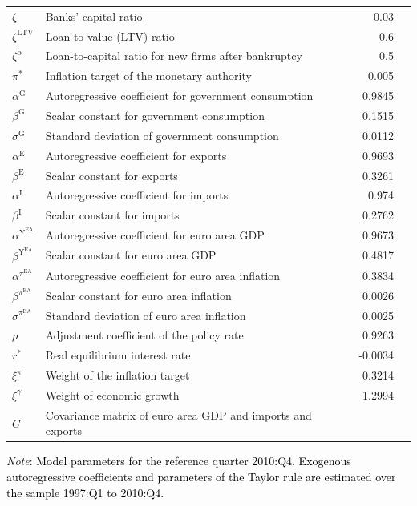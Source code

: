 \begin{table}[!htbp]
{\begin{tabular}{llrl}
			$\zeta$ & Banks' capital ratio & 0.03 & \\ 
			$\zeta^{\mathrm{LTV}}$ & Loan-to-value (LTV) ratio & 0.6 & \\ 
			$\zeta^{\mathrm{b}}$ & Loan-to-capital ratio for new firms after bankruptcy & 0.5 & \\ 
			$\pi^{*}$ & Inflation target of the monetary authority & 0.005 & \\ 
			\midrule
			$\alpha^{\mathrm{G}}$ & Autoregressive coefficient for government consumption & 0.9845 & \multirow{14}{*}{\rotatebox[origin=c]{90}{\parbox[c]{5.5cm}{\centering national accounts\\ (exogenously estimated)}}} \\ 
			$\beta^{\mathrm{G}}$ & Scalar constant for government consumption & 0.1515 & \\ 
			$\sigma^{\mathrm{G}}$ & Standard deviation of government consumption & 0.0112 & \\ 
			$\alpha^{\mathrm{E}}$ & Autoregressive coefficient for exports & 0.9693 & \\ 
			$\beta^{\mathrm{E}}$ & Scalar constant for exports & 0.3261 & \\ 
			$\alpha^{\mathrm{I}}$ & Autoregressive coefficient for imports & 0.974 & \\ 
			$\beta^{\mathrm{I}}$ & Scalar constant for imports & 0.2762 & \\ 
			$\alpha^{\mathrm{Y}^{\mathrm{EA}}}$ & Autoregressive coefficient for euro area GDP & 0.9673 & \\ 
			$\beta^{\mathrm{Y}^{\mathrm{EA}}}$ & Scalar constant for euro area GDP & 0.4817 & \\ 
			$\alpha^{\pi^{\mathrm{EA}}}$ & Autoregressive coefficient for euro area inflation & 0.3834 & \\ 
			$\beta^{\pi^{\mathrm{EA}}}$ & Scalar constant for euro area inflation & 0.0026 & \\ 
			$\sigma^{\pi^{\mathrm{EA}}}$ & Standard deviation of euro area inflation & 0.0025 & \\ 
			$\rho$ & Adjustment coefficient of the policy rate & 0.9263 & \\ 
			$r^{*}$ & Real equilibrium interest rate & -0.0034 & \\ 
			$\xi^{\pi}$ & Weight of the inflation target & 0.3214 & \\ 
			$\xi^{\gamma}$ & Weight of economic growth & 1.2994 & \\ 
			$C$ & Covariance matrix of euro area GDP and imports and exports & & \\ 
			\bottomrule
		\end{tabular}
	}
	\begin{tablenotes}
		\footnotesize \item \textit{Note}: \textcolor{black}{Model parameters for the reference quarter 2010:Q4. Exogenous autoregressive coefficients and parameters of the Taylor rule are estimated over the sample 1997:Q1 to 2010:Q4.}
	\end{tablenotes}
\end{table}